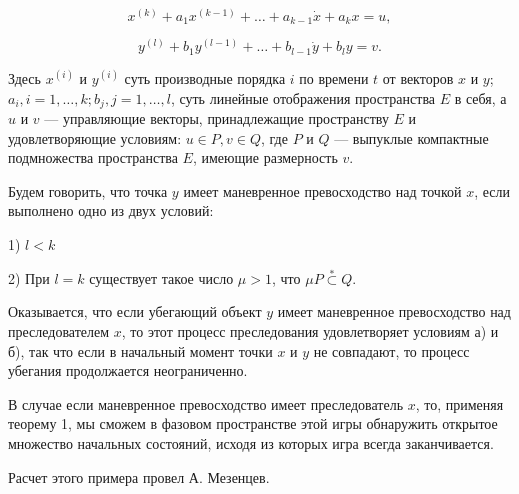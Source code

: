\documentclass[10pt]{article}
\begin{document}
\[
{x}^{\left( k\right) } + {a}_{1}{x}^{\left( k - 1\right) } + \ldots  + {a}_{k - 1}\dot{x} + {a}_{k}x = u,
\]

\[
{y}^{\left( l\right) } + {b}_{1}{y}^{\left( l - 1\right) } + \ldots  + {b}_{l - 1}\dot{y} + {b}_{l}y = v.
\]

Здесь \({x}^{\left( i\right) }\) и \({y}^{\left( i\right) }\) суть производные порядка \(i\) по времени \(t\) от векторов \(x\) и \(y\); \({a}_{i}, i = 1,\ldots,k; {b}_{j}, j = 1,\ldots,l\), суть линейные отображения пространства \(E\) в себя, а \(u\) и \(v\) — управляющие векторы, принадлежащие пространству \(E\) и удовлетворяющие условиям: \(u \in  P, v \in  Q\), где \(P\) и \(Q\) — выпуклые компактные подмножества пространства \(E\), имеющие размерность \(v\).

Будем говорить, что точка \(y\) имеет маневренное превосходство над точкой \(x\), если выполнено одно из двух условий:

1) \(l < k\)

2) При \(l = k\) существует такое число \(\mu > 1\), что \(\mu P\overset{ * }{ \subset  }Q\).

Оказывается, что если убегающий объект \(y\) имеет маневренное превосходство над преследователем \(x\), то этот процесс преследования удовлетворяет условиям а) и б), так что если в начальный момент точки \(x\) и \(y\) не совпадают, то процесс убегания продолжается неограниченно.

В случае если маневренное превосходство имеет преследователь \(x\), то, применяя теорему 1, мы сможем в фазовом пространстве этой игры обнаружить открытое множество начальных состояний, исходя из которых игра всегда заканчивается.

Расчет этого примера провел А. Мезенцев.

\newpage
\end{document}

